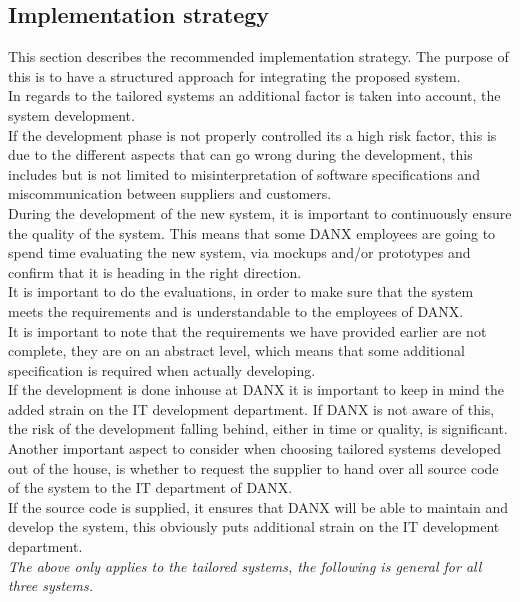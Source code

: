 \subsection{Implementation strategy}
This section describes the recommended implementation strategy. The purpose of this is to have a structured approach for integrating the proposed system.\\
In regards to the tailored systems an additional factor is taken into account, the system development.\\
If the development phase is not properly controlled its a high risk factor, this is due to the different aspects that can go wrong during the development, this includes but is not limited to misinterpretation of software specifications and miscommunication between suppliers and customers.\\
During the development of the new system, it is important to continuously ensure the quality of the system. This means that some DANX employees are going to spend time evaluating the new system, via mockups and/or prototypes and confirm that it is heading in the right direction. \\
It is important to do the evaluations, in order to make sure that the system meets the requirements and is understandable to the employees of DANX.\\
It is important to note that the requirements we have provided earlier are not complete, they are on an abstract level, which means that some additional specification is required when actually developing.\\
If the development is done inhouse at DANX it is important to keep in mind the added strain on the IT development department. If DANX is not aware of this, the risk of the development falling behind, either in time or quality, is significant. \\
Another important aspect to consider when choosing tailored systems developed out of the house, is whether to request the supplier to hand over all source code of the system to the IT department of DANX.\\
If the source code is supplied, it ensures that DANX will be able to maintain and develop the system, this obviously puts additional strain on the IT development department.\\

\textit{The above only applies to the tailored systems, the following is general for all three systems.}

